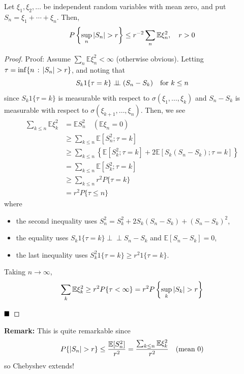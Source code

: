 \begin{lemma}
    Let $\xi_1, \xi_2, \ldots$ be independent random variables with mean zero, and put $S_n = \xi_1 + \cdots + \xi_n$. Then,
    \[ P\left\{\sup_n \abs{S_n} > r\right\} \leq r^{-2}\sum_n \mathbb{E}\xi_n^2, \quad r > 0 \]
\end{lemma}
\begin{proof}{Proof:}
    Assume $\sum_n \mathbb{E}\xi_n^2 < \infty$ (otherwise obvious). Letting $\tau = \inf\{n \col \abs{S_n} > r\}$, and noting that
    \[ S_k1\{\tau = k\} \perp\!\!\!\perp (S_n - S_k) \quad \tt{for } k \leq n \]
    since $S_k1\{\tau = k\}$ is measurable with respect to $\sigma(\xi_1, \ldots, \xi_k)$ and $S_n - S_k$ is measurable with respect to $\sigma(\xi_{k + 1}, \ldots, \xi_n)$. Then, we see
    \begin{align*}
        \sum_{k \leq n} \mathbb{E}\xi_k^2 &= \mathbb{E}S_n^2 \quad (\mathbb{E}\xi_n = 0)\\
        &\geq \sum_{k \leq n} \mathbb{E}[S_n^2 ; \tau = k]\\
        &\geq \sum_{k \leq n}\left\{\mathbb{E}[S_k^2 ; \tau = k] + 2\mathbb{E}[S_k(S_n - S_k) ; \tau = k]\right\}\\
        &= \sum_{k \leq n} \mathbb{E}[S_k^2 ; \tau = k]\\
        &\geq \sum_{k \leq n} r^2P\{\tau = k\}\\
        &= r^2P\{\tau \leq n\}
    \end{align*}
    where
    \begin{itemize}
        \item the second inequality uses $S_n^2 = S_k^2 + 2S_k(S_n - S_k) + (S_n - S_k)^2$,
        \item the equality uses $S_k1\{\tau = k\} \perp\!\!\!\perp S_n - S_k$ and $\mathbb{E}[S_n - S_k] = 0$,
        \item the last inequality uses $S_k^2 1\{\tau = k\} \geq r^2 1\{\tau = k\}$.
    \end{itemize}
    Taking $n \to \infty$,
    \[ \sum_k \mathbb{E}\xi_k^2 \geq r^2P\{\tau < \infty\} = r^2P\left\{\sup_k \abs{S_k} > r\right\} \]

    $\qed$
\end{proof}

\textbf{Remark:} This is quite remarkable since
\[ P\{\abs{S_n} > r\} \leq \frac{\mathbb{E}[S_n^2]}{r^2} = \frac{\sum_{k \leq n} \mathbb{E}\xi_k^2}{r^2} \quad (\tt{mean } 0) \]
so Chebyshev extends!

